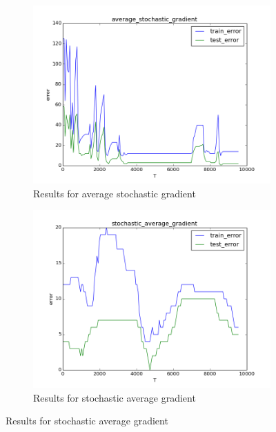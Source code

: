 \documentclass{article}
\begin{document}
\begin{figure}
	\centering
	\begin{subfigure}[b]{0.45\textwidth} 
		\includegraphics[width=\textwidth]{../results/average_stochastic_gradient.png}
		\caption{Results for average stochastic gradient}
		\label{fig7}
	\end{subfigure}
	\begin{subfigure}[b]{0.45\textwidth} 
		\includegraphics[width=\textwidth]{../results/stochastic_average_gradient.png}
		\caption{Results for stochastic average gradient}
		\label{fig8}
	\end{subfigure}
\end{figure}
\end{document}
